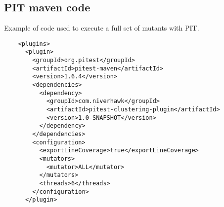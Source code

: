 \begin{appendices}
	
\chapter{PIT maven code}
\label{ap:PIT_maven_code}
Example of code used to execute a full set of mutants with PIT.
\begin{lstlisting}
    <plugins>
      <plugin>
        <groupId>org.pitest</groupId>
        <artifactId>pitest-maven</artifactId>
        <version>1.6.4</version>
        <dependencies>
          <dependency>
            <groupId>com.niverhawk</groupId>
            <artifactId>pitest-clustering-plugin</artifactId>
            <version>1.0-SNAPSHOT</version>
          </dependency>
        </dependencies>
        <configuration>
          <exportLineCoverage>true</exportLineCoverage>
          <mutators>
            <mutator>ALL</mutator>
          </mutators>
          <threads>6</threads>
        </configuration>
      </plugin>
\end{lstlisting}
	
\end{appendices}